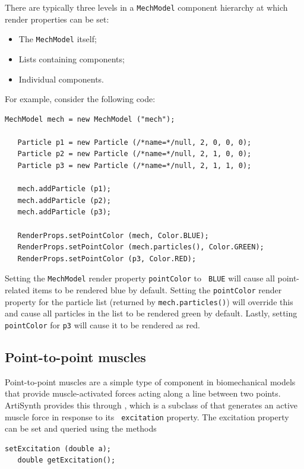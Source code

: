 There are typically three levels in a {\tt MechModel} component
hierarchy at which render properties can be set:

\begin{itemize}

\item The {\tt MechModel} itself;

\item Lists containing components;

\item Individual components.

\end{itemize}

For example, consider the following code:
%
\begin{lstlisting}[]
   MechModel mech = new MechModel ("mech");

   Particle p1 = new Particle (/*name=*/null, 2, 0, 0, 0);
   Particle p2 = new Particle (/*name=*/null, 2, 1, 0, 0);
   Particle p3 = new Particle (/*name=*/null, 2, 1, 1, 0);

   mech.addParticle (p1);
   mech.addParticle (p2);
   mech.addParticle (p3);

   RenderProps.setPointColor (mech, Color.BLUE);
   RenderProps.setPointColor (mech.particles(), Color.GREEN);
   RenderProps.setPointColor (p3, Color.RED);   
\end{lstlisting}
%
Setting the {\tt MechModel} render property {\tt pointColor} to {\tt
BLUE} will cause all point-related items to be rendered blue by
default. Setting the {\tt pointColor} render property for the particle
list (returned by {\tt mech.particles()}) will override this and cause
all particles in the list to be rendered green by default. Lastly,
setting {\tt pointColor} for {\tt p3} will cause it to be rendered as
red.

\subsection{Point-to-point muscles}
\label{PointToPointMuscles:sec}

Point-to-point muscles are a simple type of component in biomechanical
models that provide muscle-activated forces acting along a line
between two points. ArtiSynth provides this through
, which is a subclass of
 that generates an
active muscle force in response to its {\tt
excitation} property. The excitation property can be set and queried
using the methods
%
\begin{lstlisting}[]
   setExcitation (double a);
   double getExcitation();
\end{lstlisting}
%

